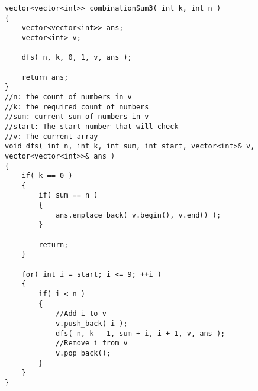 \setcounter{lstlisting}{0}
\begin{lstlisting}[style=customc, caption={Backtracking}]
vector<vector<int>> combinationSum3( int k, int n )
{
    vector<vector<int>> ans;
    vector<int> v;

    dfs( n, k, 0, 1, v, ans );
	
    return ans;
}
//n: the count of numbers in v
//k: the required count of numbers
//sum: current sum of numbers in v
//start: The start number that will check
//v: The current array
void dfs( int n, int k, int sum, int start, vector<int>& v, vector<vector<int>>& ans )
{
    if( k == 0 )
    {
        if( sum == n )
        {
            ans.emplace_back( v.begin(), v.end() );
        }

        return;
    }

    for( int i = start; i <= 9; ++i )
    {
        if( i < n )
        {
			//Add i to v
            v.push_back( i );
            dfs( n, k - 1, sum + i, i + 1, v, ans );
			//Remove i from v
            v.pop_back();
        }
    }
}
\end{lstlisting}